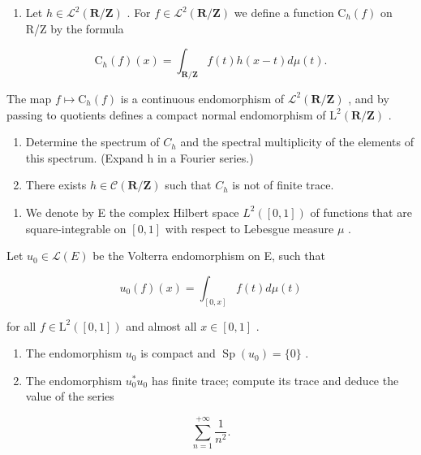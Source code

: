 \begin{enumerate}
\def\labelenumi{\alph{enumi})}
\tightlist
\item
  Let \(h \in \mathcal{L}^{2}(\mathbf{R}/\mathbf{Z})\) . For \(f \in \mathcal{L}^{2}(\mathbf{R}/\mathbf{Z})\) we define a function \(\mathrm{C}_{h}(f)\) on R/Z by the formula
\end{enumerate}

\[
\mathrm{C} _ {h} (f) (x) = \int_ {\mathbf {R} / \mathbf {Z}} f (t) h (x - t) d \mu (t).
\]

The map \(f \mapsto \mathrm{C}_h(f)\) is a continuous endomorphism of \(\mathcal{L}^2(\mathbf{R}/\mathbf{Z})\) , and by passing to quotients defines a compact normal endomorphism of \(\mathrm{L}^2(\mathbf{R}/\mathbf{Z})\) .

\begin{enumerate}
\def\labelenumi{\alph{enumi})}
\setcounter{enumi}{1}
\item
  Determine the spectrum of \(C_{h}\) and the spectral multiplicity of the elements of this spectrum. (Expand h in a Fourier series.)
\item
  There exists \(h \in \mathcal{C}(\mathbf{R}/\mathbf{Z})\) such that \(C_{h}\) is not of finite trace.
\end{enumerate}

\begin{enumerate}
\def\labelenumi{\arabic{enumi})}
\setcounter{enumi}{8}
\tightlist
\item
  We denote by E the complex Hilbert space \(L^{2}([0,1])\) of functions that are square-integrable on \([0,1]\) with respect to Lebesgue measure \(\mu\) .
\end{enumerate}

Let \(u_{0} \in \mathcal{L}(E)\) be the Volterra endomorphism on E, such that

\[
u _ {0} (f) (x) = \int_ {[ 0, x ]} f (t) d \mu (t)
\]

for all \(f \in \mathrm{L}^2([0,1])\) and almost all \(x \in [0,1]\) .

\begin{enumerate}
\def\labelenumi{\alph{enumi})}
\item
  The endomorphism \(u_{0}\) is compact and \(\operatorname{Sp}(u_{0})=\{0\}\) .
\item
  The endomorphism \(u_0^* u_0\) has finite trace; compute its trace and deduce the value of the series
\end{enumerate}

\[
\sum_ {n = 1} ^ {+ \infty} \frac {1}{n ^ {2}}.
\]

